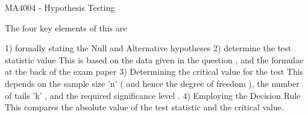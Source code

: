  MA4004 - Hypothesis Testing
 
 
 
The four key elements of this are
 
1) formally stating the Null and Alternative hypotheses
2) determine the test statistic value
    This is based on the data given in the question , and the formulae at the back of the exam paper
3) Determining the critical value for the test
     This depends on
        the sample size 'n'  ( and hence the degree of freedom ),
        the number of tails 'k' ,
        and the required significance level .
4) Employing the Decision Rule
        This compares the absolute value of the test statistic and the critical value.
 
